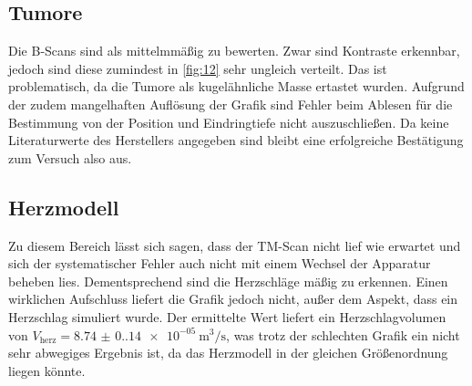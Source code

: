 \subsection{Tumore}
Die B-Scans sind als mittelmmäßig zu bewerten. Zwar sind Kontraste erkennbar, 
jedoch sind diese zumindest in \autoref{fig:12} sehr ungleich verteilt. Das 
ist problematisch, da die Tumore als kugelähnliche Masse ertastet wurden. 
Aufgrund der zudem mangelhaften Auflösung der Grafik sind Fehler beim Ablesen 
für die Bestimmung von der Position und Eindringtiefe nicht auszuschließen. 
Da keine Literaturwerte des Herstellers angegeben sind bleibt eine erfolgreiche 
Bestätigung zum Versuch also aus.

\subsection{Herzmodell}
Zu diesem Bereich lässt sich sagen, dass der TM-Scan nicht lief wie erwartet und 
sich der systematischer Fehler auch nicht mit einem Wechsel der Apparatur 
beheben lies. Dementsprechend sind die Herzschläge mäßig zu erkennen. Einen 
wirklichen Aufschluss liefert die Grafik jedoch nicht, außer dem Aspekt, dass 
ein Herzschlag simuliert wurde. Der ermittelte Wert liefert ein Herzschlagvolumen
von $V_\text{herz} = \qty{8.74(0.14)e-05}{\meter^3\per\second}$, was trotz der 
schlechten Grafik ein nicht sehr abwegiges Ergebnis ist, da das Herzmodell 
in der gleichen Größenordnung liegen könnte.
